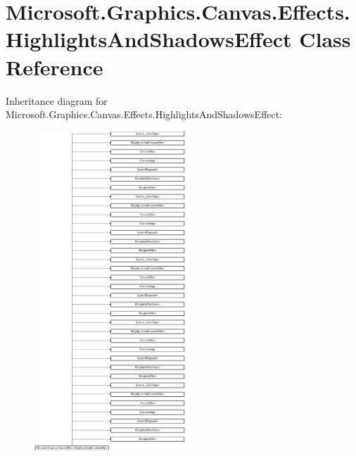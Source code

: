 \hypertarget{class_microsoft_1_1_graphics_1_1_canvas_1_1_effects_1_1_highlights_and_shadows_effect}{}\section{Microsoft.\+Graphics.\+Canvas.\+Effects.\+Highlights\+And\+Shadows\+Effect Class Reference}
\label{class_microsoft_1_1_graphics_1_1_canvas_1_1_effects_1_1_highlights_and_shadows_effect}
Inheritance diagram for Microsoft.\+Graphics.\+Canvas.\+Effects.\+Highlights\+And\+Shadows\+Effect\+:\begin{figure}[H]
\begin{center}
\leavevmode
\includegraphics[height=12.000000cm]{class_microsoft_1_1_graphics_1_1_canvas_1_1_effects_1_1_highlights_and_shadows_effect}
\end{center}
\end{figure}
